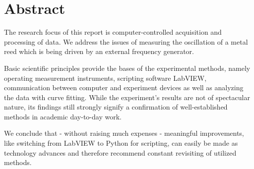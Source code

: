 \section*{Abstract}

The research focus of this report is computer-controlled acquisition and processing of data.
We address the issues of measuring the oscillation of a metal reed which is being driven by an external frequency generator.

Basic scientific principles provide the bases of the experimental methods, namely operating measurement instruments, scripting software LabVIEW, communication between computer and experiment devices as well as analyzing the data with curve fitting.
While the experiment's results are not of spectacular nature, its findings still strongly signify a confirmation of well-established methods in academic day-to-day work.

We conclude that - without raising much expenses - meaningful improvements, like switching from LabVIEW to Python for scripting, can easily be made as technology advances and therefore recommend constant revisiting of utilized methods.

\vspace{5mm}
